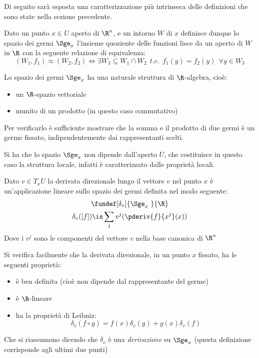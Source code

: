 Di seguito sarà esposta una caratterizzazione più intrinseca delle definizioni che sono state nella sezione precedente.

\begin{defn}
Dato un punto $x\in U$ aperto di $\R ^n$, e un intorno $W$ di $x$ definisce dunque lo spazio dei germi $\Sge_x$ l'insieme quoziente delle funzioni lisce da un aperto di $W$ in $\R$ con la seguente relazione di equivalenza:
\begin{equation*}
(W_1, f_1) \approx (W_2, f_2) \iff \exists W_3 \subseteq W_1 \cap W_2~~ t.c.~~ f_1(y)=f_2(y)~~ \forall y\in W_3
\end{equation*}
\end{defn}


Lo spazio dei germi $\Sge_x$ ha una  naturale struttura di $\R$-algebra, cioè:
\begin{itemize}
\item un $\R$-spazio vettoriale
\item munito di un prodotto (in questo caso commutativo)
\end{itemize}
Per verificarlo è sufficiente mostrare che la somma e il prodotto di due germi è un germe fissato, indipendentemente dai rappresentanti scelti.

\begin{oss}
Si ha che lo spazio $\Sge_x$ non dipende dall'aperto $U$, che costituisce in questo caso la struttura locale, infatti è caratterizzato dalle proprietà locali.
\end{oss}

\begin{defn}
Dato $v\in T_x U$ la derivata direzionale lungo il vettore $v$ nel punto $x$ è un'applicazione lineare sullo spazio dei germi definita nel modo seguente:
\begin{gather*}
\fundef[\delta_v]{\Sge_x~}{\R} \\
\delta_v([f]) \is \sum_j v^j (\pderiv{f}{x^j}(x))
\end{gather*}
Dove i $v^j$ sono le componenti del vettore $v$ nella base canonica di $\R ^n$
\end{defn}

\begin{oss}
Si verifica facilmente che la derivata direzionale, in un punto $x$ fissato, ha le seguenti proprietà:
\begin{itemize}
\item è ben definita (cioè non dipende dal rappresentante del germe)
\item è $\R$-lineare
\item ha la proprietà di Leibniz:
\begin{equation*}
\delta_v(f\circ g) = f(x)\delta_v(g) + g(x)\delta_v(f)
\end{equation*}
\end{itemize}
Che si riassumono dicendo che $\delta_v$ è una \emph{derivazione} su $\Sge_x$ (questa definizione corrisponde agli ultimi due punti)
\end{oss}

